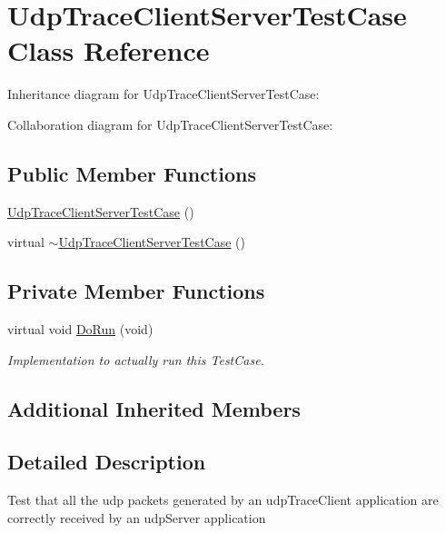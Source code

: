 \hypertarget{classUdpTraceClientServerTestCase}{}\section{Udp\+Trace\+Client\+Server\+Test\+Case Class Reference}
\label{classUdpTraceClientServerTestCase}


Inheritance diagram for Udp\+Trace\+Client\+Server\+Test\+Case\+:


Collaboration diagram for Udp\+Trace\+Client\+Server\+Test\+Case\+:
\subsection*{Public Member Functions}
\begin{DoxyCompactItemize}
\item 
\hyperlink{classUdpTraceClientServerTestCase_a4dc87a34066389348fb589fd0dd19eff}{Udp\+Trace\+Client\+Server\+Test\+Case} ()
\item 
virtual \hyperlink{classUdpTraceClientServerTestCase_a70a8bb4496abb431e9b2e40a840cc9a4}{$\sim$\+Udp\+Trace\+Client\+Server\+Test\+Case} ()
\end{DoxyCompactItemize}
\subsection*{Private Member Functions}
\begin{DoxyCompactItemize}
\item 
virtual void \hyperlink{classUdpTraceClientServerTestCase_a067367203d92eb6f9edaee3c17da6d8a}{Do\+Run} (void)
\begin{DoxyCompactList}\small\item\em Implementation to actually run this Test\+Case. \end{DoxyCompactList}\end{DoxyCompactItemize}
\subsection*{Additional Inherited Members}


\subsection{Detailed Description}
Test that all the udp packets generated by an udp\+Trace\+Client application are correctly received by an udp\+Server application 

